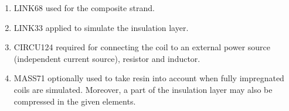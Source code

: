 \begin{enumerate}
    \item LINK68 used for the composite strand.
    \item LINK33 applied to simulate the insulation layer.
    \item CIRCU124 required for connecting the coil to an external power source (independent current source), resistor and inductor.
    \item MASS71 optionally used to take resin into account when fully impregnated coils are simulated. Moreover, a part of the insulation layer may also be compressed in the given elements.
\end{enumerate}
